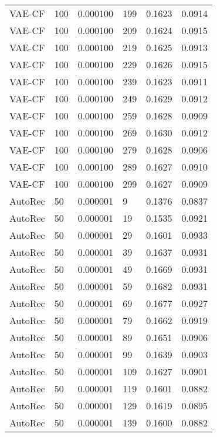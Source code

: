 \begin{tabular}{llrlrr}
  VAE-CF &  100 &  0.000100 &   199 &  0.1623 &       0.0914 \\
  VAE-CF &  100 &  0.000100 &   209 &  0.1624 &       0.0915 \\
  VAE-CF &  100 &  0.000100 &   219 &  0.1625 &       0.0913 \\
  VAE-CF &  100 &  0.000100 &   229 &  0.1626 &       0.0915 \\
  VAE-CF &  100 &  0.000100 &   239 &  0.1623 &       0.0911 \\
  VAE-CF &  100 &  0.000100 &   249 &  0.1629 &       0.0912 \\
  VAE-CF &  100 &  0.000100 &   259 &  0.1628 &       0.0909 \\
  VAE-CF &  100 &  0.000100 &   269 &  0.1630 &       0.0912 \\
  VAE-CF &  100 &  0.000100 &   279 &  0.1628 &       0.0906 \\
  VAE-CF &  100 &  0.000100 &   289 &  0.1627 &       0.0910 \\
  VAE-CF &  100 &  0.000100 &   299 &  0.1627 &       0.0909 \\
 AutoRec &   50 &  0.000001 &     9 &  0.1376 &       0.0837 \\
 AutoRec &   50 &  0.000001 &    19 &  0.1535 &       0.0921 \\
 AutoRec &   50 &  0.000001 &    29 &  0.1601 &       0.0933 \\
 AutoRec &   50 &  0.000001 &    39 &  0.1637 &       0.0931 \\
 AutoRec &   50 &  0.000001 &    49 &  0.1669 &       0.0931 \\
 AutoRec &   50 &  0.000001 &    59 &  0.1682 &       0.0931 \\
 AutoRec &   50 &  0.000001 &    69 &  0.1677 &       0.0927 \\
 AutoRec &   50 &  0.000001 &    79 &  0.1662 &       0.0919 \\
 AutoRec &   50 &  0.000001 &    89 &  0.1651 &       0.0906 \\
 AutoRec &   50 &  0.000001 &    99 &  0.1639 &       0.0903 \\
 AutoRec &   50 &  0.000001 &   109 &  0.1627 &       0.0901 \\
 AutoRec &   50 &  0.000001 &   119 &  0.1601 &       0.0882 \\
 AutoRec &   50 &  0.000001 &   129 &  0.1619 &       0.0895 \\
 AutoRec &   50 &  0.000001 &   139 &  0.1600 &       0.0882 \\

\end{tabular}
